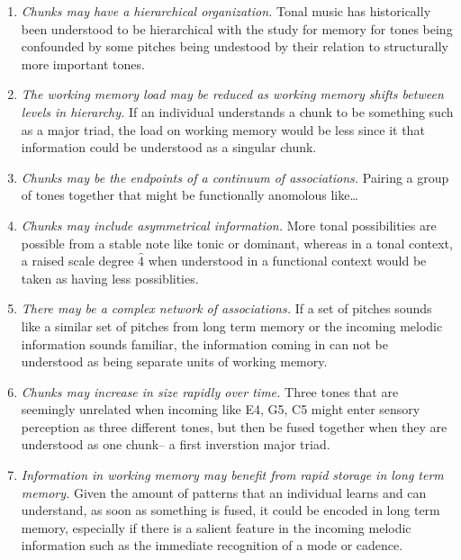 \documentclass[]{book}
\providecommand{\tightlist}{%
  \setlength{\itemsep}{0pt}\setlength{\parskip}{0pt}}
\theoremstyle{definition}
\theoremstyle{definition}
\theoremstyle{definition}
\theoremstyle{remark}
\begin{document}
\begin{enumerate}
\def\labelenumi{\arabic{enumi}.}
\tightlist
\item
  \emph{Chunks may have a hierarchical organization.} Tonal music has
  historically been understood to be hierarchical
  \citep{krumhanslCognitiveFoundationsMusical2001, meyerEmotionMeaningMusic1956, schenkerFreieSatz1935}
  with the study for memory for tones being confounded by some pitches
  being undestood by their relation to structurally more important
  tones.
\item
  \emph{The working memory load may be reduced as working memory shifts
  between levels in hierarchy.} If an individual understands a chunk to
  be something such as a major triad, the load on working memory would
  be less since it that information could be understood as a singular
  chunk.
\item
  \emph{Chunks may be the endpoints of a continuum of associations.}
  Pairing a group of tones together that might be functionally anomolous
  like\ldots{}
\item
  \emph{Chunks may include asymmetrical information.} More tonal
  possibilities are possible from a stable note like tonic or dominant,
  whereas in a tonal context, a raised scale degree \(\hat{4}\) when
  understood in a functional context would be taken as having less
  possiblities.
\item
  \emph{There may be a complex network of associations.} If a set of
  pitches sounds like a similar set of pitches from long term memory or
  the incoming melodic information sounds familiar, the information
  coming in can not be understood as being separate units of working
  memory.
\item
  \emph{Chunks may increase in size rapidly over time.} Three tones that
  are seemingly unrelated when incoming like E4, G5, C5 might enter
  sensory perception as three different tones, but then be fused
  together when they are understood as one chunk-- a first inverstion
  major triad.
\item
  \emph{Information in working memory may benefit from rapid storage in
  long term memory.} Given the amount of patterns that an individual
  learns and can understand, as soon as something is fused, it could be
  encoded in long term memory, especially if there is a salient feature
  in the incoming melodic information such as the immediate recognition
  of a mode or cadence.
\end{enumerate}
\end{document}
